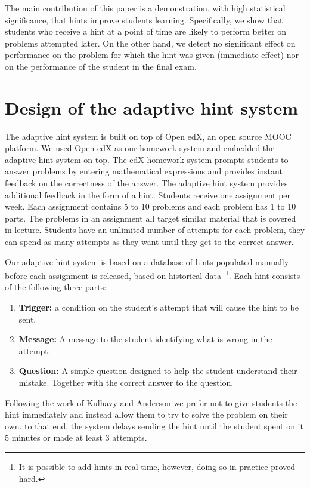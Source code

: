\documentclass{sigchi}
\begin{document}
The main contribution of this paper is a demonstration, with high
statistical significance, that hints improve students learning. Specifically, we show that students who receive a hint at
a point of time are likely to perform better on problems attempted
later. On the other hand, we detect no significant effect on
performance on the problem for which the hint was given (immediate effect) nor on the performance of the student in the final exam.


\section*{Design of the adaptive hint system}
The adaptive hint system is built on top of Open edX, an open source MOOC platform. We used Open edX as our homework system and embedded the adaptive hint system on top. The edX homework system prompts students to answer problems by entering mathematical expressions and provides instant feedback on the correctness of the answer. The adaptive hint system provides additional feedback in the form of a hint. Students receive one assignment per week. Each assignment contains 5 to 10 problems and each problem has 1 to 10 parts. The problems in an assignment all target similar material that is covered in lecture. Students have an unlimited number of attempts for each problem, they can spend as many attempts as they want until they get to the correct answer.

Our adaptive hint system is based on a database of hints populated manually before each assignment is released, based
on historical data~\footnote{It is possible to add hints in
real-time, however, doing so in practice proved hard.}. Each hint
consists of the following three parts:
\begin{enumerate}
\item {\bf Trigger:} a condition on the student's attempt that will
  cause the hint to be sent.
\item {\bf Message:} A message to the student identifying what is
  wrong in the attempt.
\item {\bf Question:} A simple question designed to help the student understand their mistake. Together with the correct answer to the question.   
\end{enumerate}


Following the work of Kulhavy and Anderson\cite{Kulhavy1972} we prefer not to give students the hint immediately and instead allow them to try to solve the problem on their own. to that end, the system delays sending the hint until the student spent on it 5 minutes or made at least 3 attempts.
\end{document}
